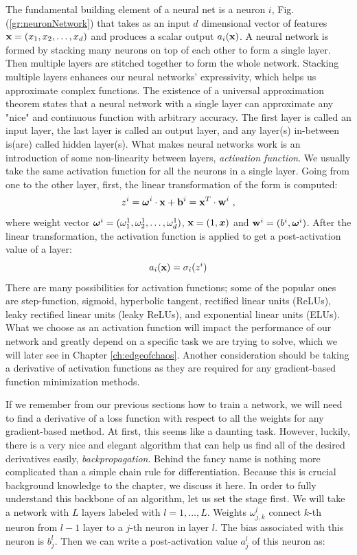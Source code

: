 The fundamental building element of a neural net is a neuron $i$, Fig.(\ref{gr:neuronNetwork}) that takes as an input $d$ dimensional vector of features $\vb{x} = (x_1, x_2, \dots, x_d)$ and produces a scalar output $a_i(\vb{x})$. A neural network is formed by stacking many neurons on top of each other to form a single layer. Then multiple layers are stitched together to form the whole network. Stacking multiple layers enhances our neural networks' expressivity, which helps us approximate complex functions. The existence of a universal approximation theorem states that a neural network with a single layer can approximate any "nice" and continuous function with arbitrary accuracy. The first layer is called an input layer, the last layer is called an output layer, and any layer(s) in-between is(are) called hidden layer(s). What makes neural networks work is an introduction of some non-linearity between layers, \textit{activation function}. We usually take the same activation function for all the neurons in a single layer. Going from one to the other layer, first, the linear transformation of the form is computed: 
\begin{equation}
	z^i = \boldsymbol{\omega}^i \cdot \vb{x} + \vb{b}^i = \vb{x}^T \cdot \vb{w}^i \ ,
\end{equation}
where weight vector $\boldsymbol{\omega}^i = (\omega_1^1, \omega_2^1, \dots, \omega_d^1)$, $\vb{x}=(1, \boldsymbol{x})$ and $\vb{w}^i = (b^i, \boldsymbol{\omega}^i)$. After the linear transformation, the activation function is applied to get a post-activation value of a layer:
\begin{equation}
	a_i(\vb{x}) = \sigma_i(z^i)
\end{equation}
There are many possibilities for activation functions; some of the popular ones are step-function, sigmoid, hyperbolic tangent, rectified linear units (ReLUs), leaky rectified linear units (leaky ReLUs), and exponential linear units (ELUs)\cite{MLintro}. What we choose as an activation function will impact the performance of our network and greatly depend on a specific task we are trying to solve, which we will later see in Chapter \ref{ch:edgeofchaos}. Another consideration should be taking a derivative of activation functions as they are required for any gradient-based function minimization methods.
\par
If we remember from our previous sections how to train a network, we will need to find a derivative of a loss function with respect to all the weights for any gradient-based method. At first, this seems like a daunting task. However, luckily, there is a very nice and elegant algorithm that can help us find all of the desired derivatives easily, \textit{backpropagation}. Behind the fancy name is nothing more complicated than a simple chain rule for differentiation. Because this is crucial background knowledge to the chapter, we discuss it here. In order to fully understand this backbone of an algorithm, let us set the stage first. We will take a network with $L$ layers labeled with $l=1,\dots, L$. Weights $\omega^l_{j,k}$ connect $k$-th neuron from $l-1$ layer to a $j$-th neuron in layer $l$. The bias associated with this neuron is $b_j^l$. Then we can write a post-activation value $a_j^l$ of this neuron as:
